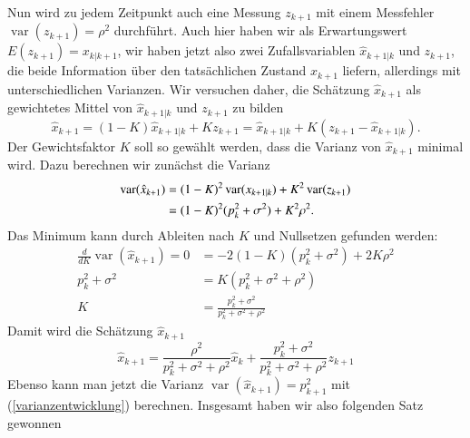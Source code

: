 Nun wird zu jedem Zeitpunkt auch eine Messung $z_{k+1}$ mit einem Messfehler
$\operatorname{var}(z_{k+1})=\rho^2$ durchführt.
Auch hier haben wir als
Erwartungswert $E(z_{k+1})=x_{k|k+1}$, wir haben jetzt also zwei Zufallsvariablen
$\hat x_{k+1|k}$ und $z_{k+1}$, die beide Information über den tatsächlichen
Zustand $x_{k+1}$ liefern, allerdings mit unterschiedlichen Varianzen.
Wir
versuchen daher, die Schätzung $\hat x_{k+1}$ als gewichtetes Mittel 
von $\hat x_{k+1|k}$ und $z_{k+1}$ zu bilden
\begin{equation}
\hat x_{k+1}=(1-K)\hat x_{k+1|k}+Kz_{k+1}=\hat x_{k+1|k}+K( z_{k+1} - \hat x_{k+1|k}).
\label{1dimentwicklung}
\end{equation}
Der Gewichtsfaktor $K$ soll so gewählt werden, dass die Varianz von $\hat x_{k+1}$
minimal wird.
Dazu berechnen wir zunächst die Varianz
\begin{align}
\operatorname{var}(\hat x_{k+1})
&=
(1-K)^2\operatorname{var}(x_{k+1|k})+K^2\operatorname{var}(z_{k+1})\notag\\
&=(1-K)^2(p_k^2+\sigma^2)+K^2\rho^2.\label{varianzentwicklung}
\end{align}
Das Minimum kann durch Ableiten nach $K$ und Nullsetzen gefunden werden:
\begin{align*}
\frac{d}{dK}\operatorname{var}(\hat x_{k+1})
=0&=
-2(1-K)(p_k^2+\sigma^2)+2K\rho^2\\
p_k^2+\sigma^2&=K(p_k^2+\sigma^2+\rho^2)\\
K&=\frac{p_k^2+\sigma^2}{p_k^2+\sigma^2+\rho^2}
\end{align*}
Damit wird die Schätzung $\hat x_{k+1}$
\[
\hat x_{k+1}=\frac{\rho^2}{p_k^2+\sigma^2+\rho^2}\hat x_k+\frac{p_k^2+\sigma^2}{p_k^2+\sigma^2+\rho^2}z_{k+1}
\]
Ebenso kann man jetzt die Varianz $\operatorname{var}(\hat x_{k+1})=p_{k+1}^2$
mit (\ref{varianzentwicklung}) berechnen.
Insgesamt haben wir also folgenden
Satz gewonnen


